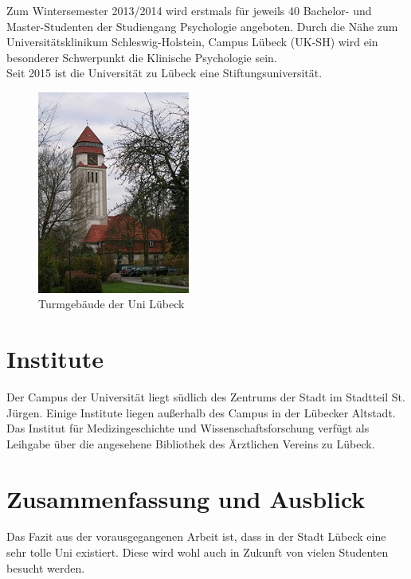 \documentclass[a4paper]{article}
\begin{document}
\noindent Zum Wintersemester 2013/2014 wird erstmals \cite{DBLP:conf/isola/Leucker0T16} für jeweils 40 Bachelor- und Master-Studenten der Studiengang Psychologie angeboten. Durch die Nähe zum Universitätsklinikum Schleswig-Holstein\cite{mueller2000}, Campus Lübeck (UK-SH) wird ein besonderer Schwerpunkt die Klinische Psychologie sein.\\

\noindent Seit 2015 ist die Universität zu Lübeck eine Stiftungsuniversität.

\begin{figure}[h]
\centerline{\includegraphics[width=5cm]{turm}}
\caption{Turmgebäude der Uni Lübeck}
\end{figure}
\begin{figure}[h]
\end{figure}

\newpage
\section{Institute}
Der Campus der Universität liegt südlich des Zentrums der Stadt im Stadtteil St. Jürgen. Einige Institute liegen außerhalb des Campus in der Lübecker Altstadt. Das Institut für Medizingeschichte und Wissenschaftsforschung verfügt als Leihgabe über die angesehene Bibliothek des Ärztlichen Vereins zu Lübeck.

\newpage
\section{Zusammenfassung und Ausblick}
Das Fazit aus der vorausgegangenen Arbeit ist, dass in der Stadt Lübeck eine sehr tolle Uni existiert. Diese wird wohl auch in Zukunft von vielen Studenten besucht werden.
\newpage


\end{document}
